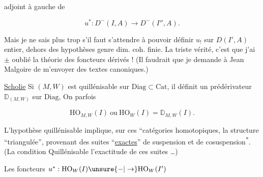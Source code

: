 
adjoint à gauche de

\[ u^*:D^-(I,A)\longrightarrow D^-(I'',A). \]

Mais je  ne sais plus trop s'il faut s'attendre à pouvoir définir $u_!$ sur $D(I',A)$  entier,   dehors des hypothèses genre dim. coh. finie. La triste vérité, c'est que j'ai $\pm$ oublié la théorie des foncteurs dérivés ! (Il faudrait que je demande  à Jean Malgoire de m'envoyer des textes canoniques.)

\uline{Scholie} Si $(M,W)$ est quillénisable sur  $\mathrm{Diag}\subset\mathrm{Cat}$,  il définit un prédérivateur  $\mathbb{D}_{(M,W)}$ sur $\mathrm{Diag}$,  On  parfois

\[ \mathrm{HO}_{M,W}(I)\ \text{ou}\ \mathrm{HO}_W(I)=\mathbb{D}_{M,W}(I). \]

L'hypothèse quillénisable implique, sur  ces ``catégories homotopiques, la structure   ``triangulée'', provenant des suites ``\uline{exactes}'' de suspension et de cosuspension\textsuperscript{*}. (La condition Quillénisable  l'exactitude de ces suites \ldots)



Les foncteurs $u^*:\mathrm{HO}_W(I)\unsure{-|\to}\mathrm{HO}_W(I')$
